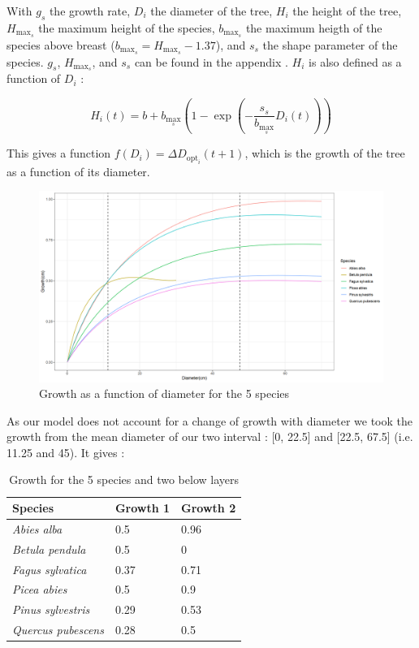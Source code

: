 \documentclass{article}
\begin{document}
With $g_s$ the growth rate, $D_i$ the diameter of the tree, $H_i$ the height of the tree, $H_{\max _s}$ the maximum height of the species, $b_{\max _s}$ the maximum heigth of the species above breast ($b_{\max _s} =  H_{\max _s} - 1.37$), and $s_s$ the shape parameter of the species. $g_s$, $H_{\max _s}$, and $s_s$ can be found in the appendix \autocite{morinForestSuccessionGap2021}. $H_i$ is also defined as a function of $D_i$ :

\begin{equation}
    H_i(t)=b+b_{\max _s}\left(1-\exp \left(-\frac{s_s}{b_{\max _s}} D_i(t)\right)\right)
    \label{eq:height}
\end{equation}

This gives a function $f(D_i) = \Delta D_{\mathrm{opt}_i}(t+1)$, which is the growth of the tree as a function of its diameter.

\begin{figure}
    \centering
    \includegraphics[width=\textwidth]{Figure/Growth_diameter.png}
    \caption{Growth as a function of diameter for the 5 species}
    \label{fig:growth_diameter}
\end{figure}

As our model does not account for a change of growth with diameter we took the growth from the mean diameter of our two interval : [0, 22.5] and [22.5, 67.5] (i.e. 11.25 and 45). It gives :

\begin{table}[H]
\begin{center}
    \begin{tabular}{lll}
    \hline
    Species & Growth 1 & Growth 2 \\ \hline
    \textit{Abies alba} & 0.5 & 0.96 \\
    \textit{Betula pendula} & 0.5 & 0 \\
    \textit{Fagus sylvatica} & 0.37 & 0.71 \\
    \textit{Picea abies} & 0.5 & 0.9 \\
    \textit{Pinus sylvestris} & 0.29 & 0.53 \\
    \textit{Quercus pubescens} & 0.28 & 0.5 \\ \hline
    \end{tabular}
    \caption{Growth for the 5 species and two below layers}
\end{center}
\end{table}
\end{document}
